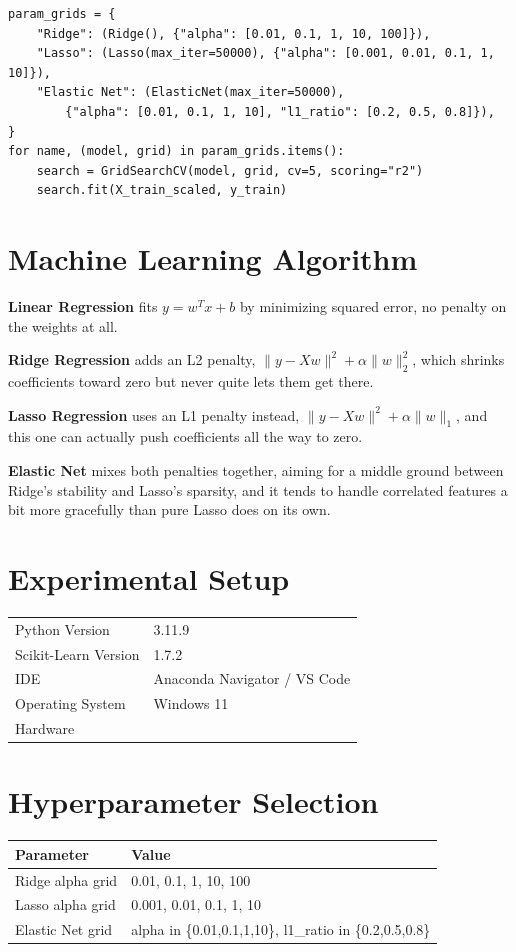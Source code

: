 \documentclass[12pt,a4paper]{article}
\begin{document}
\begin{lstlisting}[caption={Grid search over Ridge, Lasso and Elastic Net, 5 fold CV}]
param_grids = {
    "Ridge": (Ridge(), {"alpha": [0.01, 0.1, 1, 10, 100]}),
    "Lasso": (Lasso(max_iter=50000), {"alpha": [0.001, 0.01, 0.1, 1, 10]}),
    "Elastic Net": (ElasticNet(max_iter=50000),
        {"alpha": [0.01, 0.1, 1, 10], "l1_ratio": [0.2, 0.5, 0.8]}),
}
for name, (model, grid) in param_grids.items():
    search = GridSearchCV(model, grid, cv=5, scoring="r2")
    search.fit(X_train_scaled, y_train)
\end{lstlisting}

\section{Machine Learning Algorithm}

\textbf{Linear Regression} fits $y = w^Tx + b$ by minimizing squared error, no penalty on the weights
at all.

\textbf{Ridge Regression} adds an L2 penalty, $\|y - Xw\|^2 + \alpha\|w\|_2^2$, which shrinks
coefficients toward zero but never quite lets them get there.

\textbf{Lasso Regression} uses an L1 penalty instead, $\|y - Xw\|^2 + \alpha\|w\|_1$, and this one can
actually push coefficients all the way to zero.

\textbf{Elastic Net} mixes both penalties together, aiming for a middle ground between Ridge's
stability and Lasso's sparsity, and it tends to handle correlated features a bit more gracefully than
pure Lasso does on its own.

\section{Experimental Setup}
\begin{tabular}{ll}
\toprule
Python Version & 3.11.9 \\
Scikit-Learn Version & 1.7.2 \\
IDE & Anaconda Navigator / VS Code \\
Operating System & Windows 11 \\
Hardware & \\
\bottomrule
\end{tabular}

\section{Hyperparameter Selection}
\begin{tabular}{ll}
\toprule
Parameter & Value\\
\midrule
Ridge alpha grid & 0.01, 0.1, 1, 10, 100 \\
Lasso alpha grid & 0.001, 0.01, 0.1, 1, 10 \\
Elastic Net grid & alpha in \{0.01,0.1,1,10\}, l1\_ratio in \{0.2,0.5,0.8\} \\
\bottomrule
\end{tabular}
\end{document}
